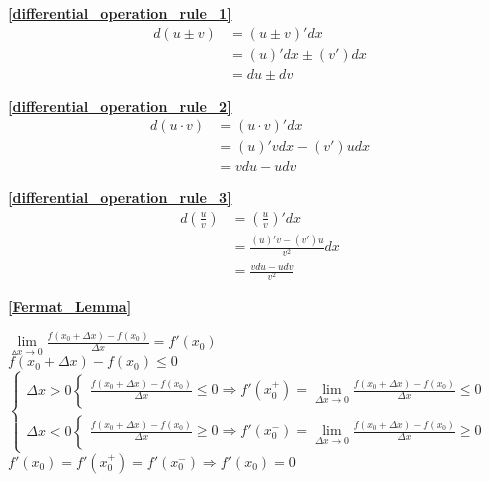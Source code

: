 \textbf{\large \ref{differential_operation_rule_1}}
\begin{align*}
        d(u\pm v)&=(u\pm v)'dx\\
                &=(u)'dx \pm (v')dx\\
                &=du\pm dv
\end{align*}

\textbf{\large \ref{differential_operation_rule_2}}
\begin{align*}
        d(u\cdot v)&=(u\cdot v)'dx\\
                &=(u)'vdx - (v')udx\\
                &=vdu - udv
\end{align*}

\textbf{\large \ref{differential_operation_rule_3}}
\begin{align*}
        d\left(\frac{u}{v}\right)&=\left(\frac{u}{v}\right)'dx\\
                &=\frac{(u)'v - (v')u}{v^2}dx\\
                &=\frac{vdu - udv}{v^2}
\end{align*}

\textbf{\large \ref{Fermat_Lemma}}
\begin{center}
    $\lim\limits_{\vartriangle x\to 0}\frac{f(x_0+\Delta x)-f(x_0)}{\Delta x}=f'(x_0)$\\
    $f(x_0+\Delta x)-f(x_0)\leqslant 0$\\
    $\begin{cases}
        \Delta x>0\begin{cases}
            \frac{f(x_0+\Delta x)-f(x_0)}{\Delta x}\leqslant 0\Rightarrow f'(x_0^+) =\lim\limits_{\Delta x \to 0}\frac{f(x_0+\Delta x)-f(x_0)}{\Delta x}\leqslant 0
        \end{cases}\\
        \Delta x<0\begin{cases}
            \frac{f(x_0+\Delta x)-f(x_0)}{\Delta x}\geqslant 0\Rightarrow f'(x_0^-) =\lim\limits_{\Delta x \to 0}\frac{f(x_0+\Delta x)-f(x_0)}{\Delta x}\geqslant 0
        \end{cases}
    \end{cases}$\\
    $f'(x_0)=f'(x_0^+)=f'(x_0^-)\Rightarrow f'(x_0)= 0$
\end{center}

